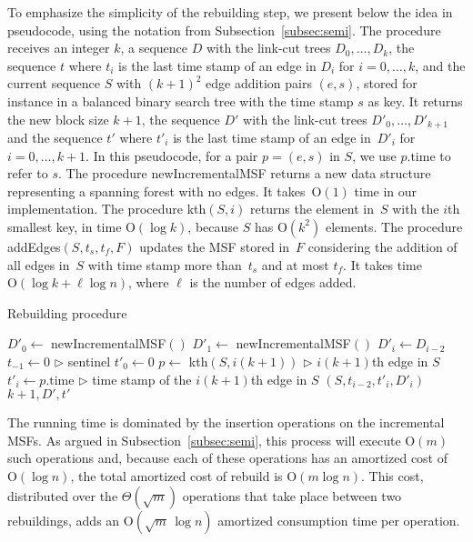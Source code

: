 \documentclass[3p,times,procedia]{elsarticle}
\newcommand{\Oh}{\mathrm{O}}
\begin{document}
To emphasize the simplicity of the rebuilding step, we present below 
the idea in pseudocode, using the notation from Subsection~\ref{subsec:semi}.
The procedure receives an integer $k$, a sequence $D$ with the link-cut trees $D_0,\ldots,D_k$, 
the sequence $t$ where $t_i$ is the last time stamp of an edge in $D_i$ for $i=0,\ldots,k$, and
the current sequence $S$ with $(k+1)^2$ edge addition pairs $(e,s)$, stored 
for instance in a balanced binary search tree with the time stamp $s$ as key.
It returns the new block size $k+1$, the sequence $D'$ with 
the link-cut trees $D'_0,\ldots,D'_{k+1}$ and the sequence $t'$ 
where $t'_i$ is the last time stamp of an edge in~$D'_i$ for $i=0,\ldots,k+1$. 
In this pseudocode, for a pair $p=(e,s)$ in $S$, we use 
$p.\textrm{time}$ to refer to $s$. %
The procedure {\sc newIncrementalMSF} returns 
a new data structure representing a spanning forest with no edges. 
It takes~$\Oh(1)$ time in our implementation. 
The procedure {\sc kth}$(S,i)$ returns the element in~$S$ with the $i$th smallest key, 
in time $\Oh(\log k)$, because $S$ has $\Oh(k^2)$ elements. 
The procedure {\sc addEdges}$(S,t_s,t_f,F)$ updates the MSF stored in~$F$ 
considering the addition of all edges in~$S$ with time stamp more than~$t_s$ 
and at most $t_f$.
It takes time $\Oh(\log k + \ell\log n)$, where $\ell$ is the number of edges added.

\medskip

\begin{algorithm}[h!]
    \caption{Rebuilding procedure}\label{rmsf-build-decomp}
    \begin{algorithmic}[1]
        \State $D'_0 \gets$ {\sc newIncrementalMSF}$()$
        \State $D'_1 \gets$ {\sc newIncrementalMSF}$()$
        \State $D'_i \gets D_{i-2}$
        \EndFor
        \State $t_{-1} \gets 0$ \hfill {\footnotesize $\rhd$ sentinel}
        \State $t'_0 \gets 0$ 
        \State $p \gets$ {\sc kth}$(S,i(k+1))$ \hfill {\footnotesize $\rhd$ $i(k+1)$th edge in $S$}
        \State $t'_i \gets p.\textrm{time}$ \hfill {\footnotesize $\rhd$ time stamp of the $i(k+1)$th edge in $S$}
        $(S,t_{i-2},t'_i,D'_i)$
        \EndFor
        \State \Return $k+1,D',t'$
        \EndFunction
    \end{algorithmic}
\end{algorithm}

The running time is dominated by the insertion operations 
on the incremental MSFs.  As argued in Subsection~\ref{subsec:semi}, 
this process will execute $\Oh(m)$ such operations and, 
because each of these operations has an amortized cost of $\Oh(\log{n})$,
the total amortized cost of {\sc rebuild} is $\Oh(m \log{n})$.  This cost, distributed 
over the $\Theta(\sqrt{m})$ operations that take place between two rebuildings,
adds an $\Oh(\sqrt{m}\,\log{n})$ amortized consumption time per operation.
\end{document}
